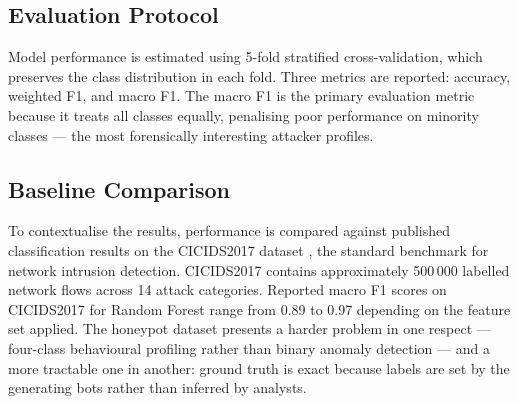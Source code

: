 \subsection{Evaluation Protocol}

Model performance is estimated using 5-fold stratified cross-validation, which
preserves the class distribution in each fold. Three metrics are reported:
accuracy, weighted F1, and macro F1. The macro F1 is the primary evaluation
metric because it treats all classes equally, penalising poor performance on
minority classes — the most forensically interesting attacker profiles.

\subsection{Baseline Comparison}

To contextualise the results, performance is compared against published
classification results on the CICIDS2017 dataset \cite{Bringer2012HoneypotSurvey},
the standard benchmark for network intrusion detection. CICIDS2017 contains
approximately 500\,000 labelled network flows across 14 attack categories.
Reported macro F1 scores on CICIDS2017 for Random Forest range from 0.89 to
0.97 depending on the feature set applied. The honeypot dataset presents a
harder problem in one respect — four-class behavioural profiling rather than
binary anomaly detection — and a more tractable one in another: ground truth is
exact because labels are set by the generating bots rather than inferred by
analysts.
